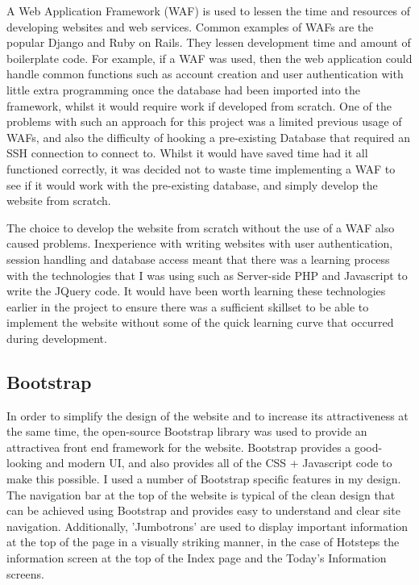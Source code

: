 \documentclass{l4proj}
\begin{document}
A Web Application Framework (WAF) is used to lessen the time and resources of developing websites and web services. Common examples of WAFs are the popular Django and Ruby on Rails. They lessen development time and amount of boilerplate code. For example, if a WAF was used, then the web application could handle common functions such as account creation and  user authentication with little extra programming once the database had been imported into the framework, whilst it would require work if developed from scratch. One of the problems with such an approach for this project was a limited previous usage of WAFs, and also the difficulty of hooking a pre-existing Database that required an SSH connection to connect to. Whilst it would have saved time had it all functioned correctly, it was decided not to waste time implementing a WAF to see if it would work with the pre-existing database, and simply develop the website from scratch.

The choice to develop the website from scratch without the use of a WAF also caused problems. Inexperience with writing websites with user authentication, session handling and database access meant that there was a learning process with the technologies that I was using such as Server-side PHP and Javascript to write the JQuery code. It would have been worth learning these technologies earlier in the project to ensure there was a sufficient skillset to be able to implement the website without some of the quick learning curve that occurred during development.

\subsection{Bootstrap}

In order to simplify the design of the website and to increase its attractiveness at the same time, the open-source Bootstrap library was used to provide an attractivea front end framework for the website. Bootstrap provides a good-looking and modern UI, and also provides all of the CSS + Javascript code to make this possible. I used a number of Bootstrap specific features in my design. The navigation bar at the top of the website is typical of the clean design that can be achieved using Bootstrap and provides easy to understand and clear site navigation. Additionally, 'Jumbotrons' are used to display important information at the top of the page in a visually striking manner, in the case of Hotsteps the information screen at the top of the Index page and the Today's Information screens.
\end{document}

